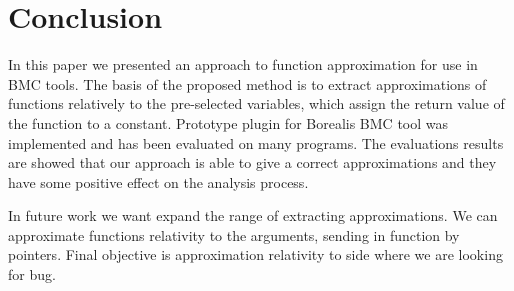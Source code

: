 \section{Conclusion}
In this paper we presented an approach to function approximation for use in BMC tools. The basis of the proposed method is to extract approximations of functions relatively to the pre-selected variables, which assign the return value of the function to a constant. Prototype plugin for Borealis BMC tool was implemented and has been evaluated on many programs. The evaluations results are showed that our approach is able to give a correct approximations and they have some positive effect on the analysis process.

In future work we want expand the range of extracting approximations. We can approximate functions relativity to the arguments, sending in function by pointers. Final objective is approximation relativity to side where we are looking for bug.
